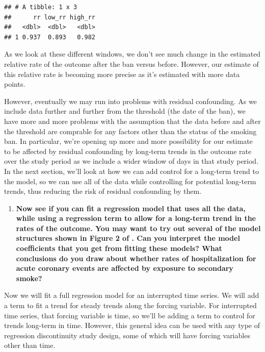 \documentclass[
]{book}
\providecommand{\tightlist}{%
  \setlength{\itemsep}{0pt}\setlength{\parskip}{0pt}}
\begin{document}
\begin{verbatim}
## # A tibble: 1 x 3
##      rr low_rr high_rr
##   <dbl>  <dbl>   <dbl>
## 1 0.937  0.893   0.982
\end{verbatim}

As we look at these different windows, we don't see much change in the estimated relative rate of the outcome after the ban versus before. However, our estimate of this relative rate is becoming more precise as it's estimated with more data points.

However, eventually we may run into problems with residual confounding. As we include data further and further from the threshold (the date of the ban), we have more and more problems with the assumption that the data before and after the threshold are comprable for any factors other than the status of the smoking ban. In particular, we're opening up more and more possibility for our estimate to be affected by residual confounding by long-term trends in the outcome rate over the study period as we include a wider window of days in that study period. In the next section, we'll look at how we can add control for a long-term trend to the model, so we can use all of the data while controlling for potential long-term trends, thus reducing the risk of residual confounding by them.

\begin{enumerate}
\def\labelenumi{\arabic{enumi}.}
\setcounter{enumi}{2}
\tightlist
\item
  \textbf{Now see if you can fit a regression model that uses all the data, while using a regression term to allow for a long-term trend in the rates of the outcome. You may want to try out several of the model structures shown in Figure 2 of \citet{bernal2017interrupted}. Can you interpret the model coefficients that you get from fitting these models? What conclusions do you draw about whether rates of hospitalization for acute coronary events are affected by exposure to secondary smoke?}
\end{enumerate}

Now we will fit a full regression model for an interrupted time series. We will add a term to fit a trend for steady trends along the forcing variable. For interrupted time series, that forcing variable is time, so we'll be adding a term to control for trends long-term in time. However, this general idea can be used with any type of regression discontinuity study design, some of which will have forcing variables other than time.
\end{document}
